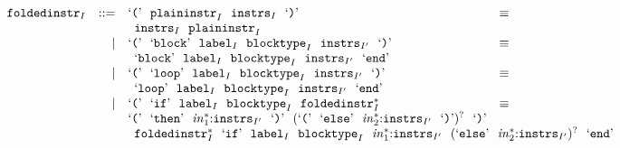 $$
\begin{array}[t]{@{}lrrl@{}l@{}l@{}l@{}}
& {{\mathtt{foldedinstr}}}_{I} & ::= & \mbox{‘\texttt{{(}}’}~~{{\mathtt{plaininstr}}}_{I}~~{{\mathtt{instrs}}}_{I}~~\mbox{‘\texttt{{)}}’} & \quad\equiv\quad{} & & \\
&&& \multicolumn{4}{@{}l@{}}{\quad
\begin{array}[t]{@{}l@{}}
{{\mathtt{instrs}}}_{I}~~{{\mathtt{plaininstr}}}_{I} \\
\end{array}
} \\
& & | & \mbox{‘\texttt{{(}}’}~~\mbox{‘\texttt{block}’}~~{{\mathtt{label}}}_{I}~~{{\mathtt{blocktype}}}_{I}~~{{\mathtt{instrs}}}_{{I'}}~~\mbox{‘\texttt{{)}}’} & \quad\equiv\quad{} & & \\
&&& \multicolumn{4}{@{}l@{}}{\quad
\begin{array}[t]{@{}l@{}}
\mbox{‘\texttt{block}’}~~{{\mathtt{label}}}_{I}~~{{\mathtt{blocktype}}}_{I}~~{{\mathtt{instrs}}}_{{I'}}~~\mbox{‘\texttt{end}’} \\
\end{array}
} \\
& & | & \mbox{‘\texttt{{(}}’}~~\mbox{‘\texttt{loop}’}~~{{\mathtt{label}}}_{I}~~{{\mathtt{blocktype}}}_{I}~~{{\mathtt{instrs}}}_{{I'}}~~\mbox{‘\texttt{{)}}’} & \quad\equiv\quad{} & & \\
&&& \multicolumn{4}{@{}l@{}}{\quad
\begin{array}[t]{@{}l@{}}
\mbox{‘\texttt{loop}’}~~{{\mathtt{label}}}_{I}~~{{\mathtt{blocktype}}}_{I}~~{{\mathtt{instrs}}}_{{I'}}~~\mbox{‘\texttt{end}’} \\
\end{array}
} \\
& & | & \begin{array}[t]{@{}l@{}} \mbox{‘\texttt{{(}}’}~~\mbox{‘\texttt{if}’}~~{{\mathtt{label}}}_{I}~~{{\mathtt{blocktype}}}_{I}~~{{{\mathtt{foldedinstr}}}_{I}^\ast} \\
  \mbox{‘\texttt{{(}}’}~~\mbox{‘\texttt{then}’}~~{{\mathit{in}}_1^\ast}{:}{{\mathtt{instrs}}}_{{I'}}~~\mbox{‘\texttt{{)}}’}~~{(\mbox{‘\texttt{{(}}’}~~\mbox{‘\texttt{else}’}~~{{\mathit{in}}_2^\ast}{:}{{\mathtt{instrs}}}_{{I'}}~~\mbox{‘\texttt{{)}}’})^?}~~\mbox{‘\texttt{{)}}’} \end{array} & \quad\equiv\quad{} & & \\
&&& \multicolumn{4}{@{}l@{}}{\quad
\begin{array}[t]{@{}l@{}}
{{{\mathtt{foldedinstr}}}_{I}^\ast}~~\mbox{‘\texttt{if}’}~~{{\mathtt{label}}}_{I}~~{{\mathtt{blocktype}}}_{I}~~{{\mathit{in}}_1^\ast}{:}{{\mathtt{instrs}}}_{{I'}}~~{(\mbox{‘\texttt{else}’}~~{{\mathit{in}}_2^\ast}{:}{{\mathtt{instrs}}}_{{I'}})^?}~~\mbox{‘\texttt{end}’} \\

\end{array}}
\end{array}$$

